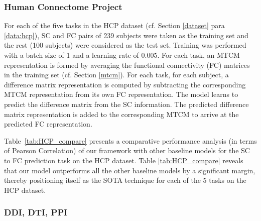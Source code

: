 
\subsubsection{Human Connectome Project}
 
 
For each of the five tasks in the HCP dataset (cf. Section \ref{dataset} para \ref{data:hcp}), SC and FC pairs of 239 subjects were
taken as the training set and the
rest (100 subjects) were considered as the test set. Training was performed with a batch size of 1 and a learning rate of 0.005. For each task, an MTCM representation is formed by averaging the functional connectivity (FC) matrices in the training set (cf. Section \ref{mtcm}). For each task, for each subject, a difference matrix representation is computed by subtracting the corresponding MTCM representation from its own FC representation. The model learns to predict the difference matrix from the SC information. The predicted difference matrix representation is added to the corresponding MTCM to arrive at the predicted FC representation.
%

Table~\ref{tab:HCP_compare} %
presents a comparative performance analysis (in terms of Pearson Correlation) of our framework with other baseline models for the SC to FC prediction task on the HCP dataset. Table \ref{tab:HCP_compare} reveals that our model outperforms all the other baseline models by a significant margin, thereby positioning itself as the SOTA technique for each of the 5 tasks %
on the HCP dataset. 



\subsubsection{DDI, DTI, PPI}
\label{sec:ddi}

